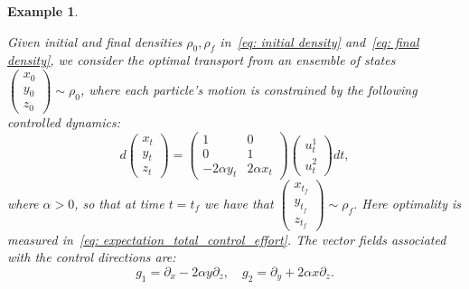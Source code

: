 \documentclass{amsart}
\newtheorem{example}[theorem]{Example}
\numberwithin{equation}{section}
\begin{document}
\begin{example}\label{ex: unified_example}
\em{Given initial and final densities $\rho_0,\rho_f$ in~\eqref{eq: initial density} and~\eqref{eq: final density}, we consider the optimal transport from an ensemble of states   $\begin{pmatrix}x_0 \\ y_0 \\ z_0\end{pmatrix} \sim \rho_0$, where each particle's motion is constrained by the following controlled dynamics:
\begin{equation}\label{eq: unified_dynamics}
d\begin{pmatrix}x_t \\ y_t \\ z_t\end{pmatrix} = \begin{pmatrix}1 & 0 \\ 0 & 1 \\ -2\alpha y_t & 2\alpha x_t\end{pmatrix}\begin{pmatrix}u^1_t \\ u^2_t\end{pmatrix}dt,
\end{equation}
where $\alpha>0$, so that at time $t=t_f$ we have that $\begin{pmatrix}x_{t_f} \\ y_{t_f} \\ z_{t_f}\end{pmatrix} \sim \rho_f$. Here optimality is measured in~\eqref{eq: expectation_total_control_effort}. The vector fields associated with the control directions are:
\begin{equation}\label{eq: unified_vector_fields}
g_1 = \partial_{x} - 2\alpha y \partial_z, \quad g_2 = \partial_{y} + 2\alpha x \partial_z.
\end{equation}

}
\end{example}
\end{document}
